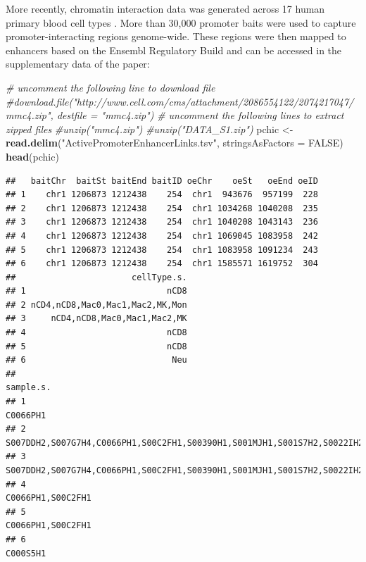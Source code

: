 \documentclass[9pt,a4paper,]{extarticle}
\newenvironment{Shaded}{\begin{snugshade}}{\end{snugshade}}
\newcommand{\KeywordTok}[1]{\textcolor[rgb]{0.13,0.29,0.53}{\textbf{#1}}}
\newcommand{\DataTypeTok}[1]{\textcolor[rgb]{0.13,0.29,0.53}{#1}}
\newcommand{\StringTok}[1]{\textcolor[rgb]{0.31,0.60,0.02}{#1}}
\newcommand{\CommentTok}[1]{\textcolor[rgb]{0.56,0.35,0.01}{\textit{#1}}}
\newcommand{\OtherTok}[1]{\textcolor[rgb]{0.56,0.35,0.01}{#1}}
\newcommand{\NormalTok}[1]{#1}
\begin{document}
More recently, chromatin interaction data was generated across 17 human primary blood cell types \citep{Javierre2016}.
More than 30,000 promoter baits were used to capture promoter-interacting regions genome-wide.
These regions were then mapped to enhancers based on the Ensembl Regulatory Build \citep{Zerbino2015} and can be accessed in the supplementary data of the paper:

\begin{Shaded}
\begin{Highlighting}[]
\CommentTok{# uncomment the following line to download file}
\CommentTok{#download.file("http://www.cell.com/cms/attachment/2086554122/2074217047/mmc4.zip", destfile = "mmc4.zip")}
\CommentTok{# uncomment the following lines to extract zipped files}
\CommentTok{#unzip("mmc4.zip")}
\CommentTok{#unzip("DATA_S1.zip")}
\NormalTok{pchic <-}\StringTok{ }\KeywordTok{read.delim}\NormalTok{(}\StringTok{"ActivePromoterEnhancerLinks.tsv"}\NormalTok{, }\DataTypeTok{stringsAsFactors =} \OtherTok{FALSE}\NormalTok{)}
\KeywordTok{head}\NormalTok{(pchic)}
\end{Highlighting}
\end{Shaded}

\begin{verbatim}
##   baitChr  baitSt baitEnd baitID oeChr    oeSt   oeEnd oeID
## 1    chr1 1206873 1212438    254  chr1  943676  957199  228
## 2    chr1 1206873 1212438    254  chr1 1034268 1040208  235
## 3    chr1 1206873 1212438    254  chr1 1040208 1043143  236
## 4    chr1 1206873 1212438    254  chr1 1069045 1083958  242
## 5    chr1 1206873 1212438    254  chr1 1083958 1091234  243
## 6    chr1 1206873 1212438    254  chr1 1585571 1619752  304
##                       cellType.s.
## 1                            nCD8
## 2 nCD4,nCD8,Mac0,Mac1,Mac2,MK,Mon
## 3     nCD4,nCD8,Mac0,Mac1,Mac2,MK
## 4                            nCD8
## 5                            nCD8
## 6                             Neu
##                                                                                                     sample.s.
## 1                                                                                                    C0066PH1
## 2 S007DDH2,S007G7H4,C0066PH1,S00C2FH1,S00390H1,S001MJH1,S001S7H2,S0022IH2,S00622H1,S00BS4H1,S004BTH2,C000S5H2
## 3          S007DDH2,S007G7H4,C0066PH1,S00C2FH1,S00390H1,S001MJH1,S001S7H2,S0022IH2,S00622H1,S00BS4H1,S004BTH2
## 4                                                                                           C0066PH1,S00C2FH1
## 5                                                                                           C0066PH1,S00C2FH1
## 6                                                                                                    C000S5H1
\end{verbatim}
\end{document}
